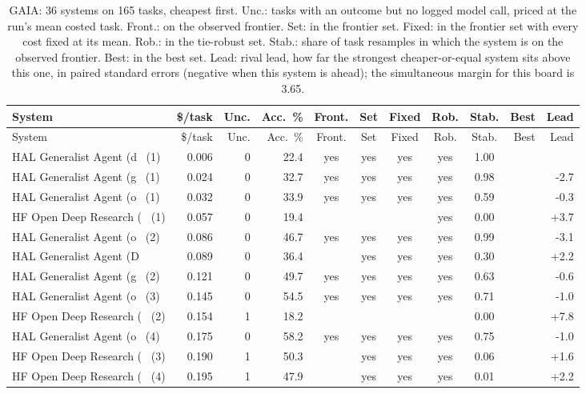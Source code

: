{\begin{longtable}{lrrrcccccrr}
\caption{GAIA: 36 systems on 165 tasks, cheapest first. Unc.: tasks with an outcome but no logged model call, priced at the run's mean costed task. Front.: on the observed frontier. Set: in the frontier set. Fixed: in the frontier set with every cost fixed at its mean. Rob.: in the tie-robust set. Stab.: share of task resamples in which the system is on the observed frontier. Best: in the best set. Lead: rival lead, how far the strongest cheaper-or-equal system sits above this one, in paired standard errors (negative when this system is ahead); the simultaneous margin for this board is 3.65.}\label{tab:supp-hal_gaia}\\
\toprule
System & \$/task & Unc. & Acc.\ \% & Front. & Set & Fixed & Rob. & Stab. & Best & Lead \\
\midrule
\endfirsthead
\toprule
System & \$/task & Unc. & Acc.\ \% & Front. & Set & Fixed & Rob. & Stab. & Best & Lead \\
\midrule
\endhead
\bottomrule
\endfoot
HAL Generalist Agent (d~ (1) & 0.006 & 0 & 22.4 & yes & yes & yes & yes & 1.00 &  &  \\
HAL Generalist Agent (g~ (1) & 0.024 & 0 & 32.7 & yes & yes & yes & yes & 0.98 &  & -2.7 \\
HAL Generalist Agent (o~ (1) & 0.032 & 0 & 33.9 & yes & yes & yes & yes & 0.59 &  & -0.3 \\
HF Open Deep Research (~ (1) & 0.057 & 0 & 19.4 &  &  &  & yes & 0.00 &  & +3.7 \\
HAL Generalist Agent (o~ (2) & 0.086 & 0 & 46.7 & yes & yes & yes & yes & 0.99 &  & -3.1 \\
HAL Generalist Agent (D~ & 0.089 & 0 & 36.4 &  & yes & yes & yes & 0.30 &  & +2.2 \\
HAL Generalist Agent (g~ (2) & 0.121 & 0 & 49.7 & yes & yes & yes & yes & 0.63 &  & -0.6 \\
HAL Generalist Agent (o~ (3) & 0.145 & 0 & 54.5 & yes & yes & yes & yes & 0.71 &  & -1.0 \\
HF Open Deep Research (~ (2) & 0.154 & 1 & 18.2 &  &  &  &  & 0.00 &  & +7.8 \\
HAL Generalist Agent (o~ (4) & 0.175 & 0 & 58.2 & yes & yes & yes & yes & 0.75 &  & -1.0 \\
HF Open Deep Research (~ (3) & 0.190 & 1 & 50.3 &  & yes & yes & yes & 0.06 &  & +1.6 \\
HF Open Deep Research (~ (4) & 0.195 & 1 & 47.9 &  & yes & yes & yes & 0.01 &  & +2.2 \\

\end{longtable}}
